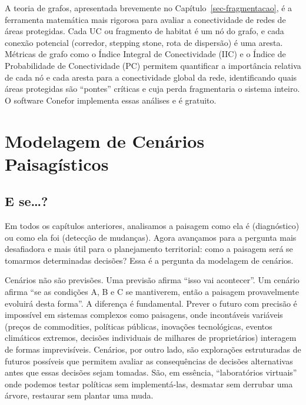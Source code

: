 \documentclass[
  portuguese,
  11pt,
  a4paper,
  open=any]{scrbook}
\begin{document}
\begin{tcolorbox}[enhanced jigsaw, colbacktitle=quarto-callout-tip-color!10!white, coltitle=black, opacityback=0, breakable, left=2mm, colback=white, bottomtitle=1mm, toptitle=1mm, titlerule=0mm, arc=.35mm, opacitybacktitle=0.6, leftrule=.75mm, colframe=quarto-callout-tip-color-frame, title=\textcolor{quarto-callout-tip-color}{\faLightbulb}\hspace{0.5em}{Para aprofundar}, rightrule=.15mm, bottomrule=.15mm, toprule=.15mm]

A teoria de grafos, apresentada brevemente no
Capítulo~\ref{sec-fragmentacao}, é a ferramenta matemática mais rigorosa
para avaliar a conectividade de redes de áreas protegidas. Cada UC ou
fragmento de habitat é um nó do grafo, e cada conexão potencial
(corredor, stepping stone, rota de dispersão) é uma aresta. Métricas de
grafo como o Índice Integral de Conectividade (IIC) e o Índice de
Probabilidade de Conectividade (PC) permitem quantificar a importância
relativa de cada nó e cada aresta para a conectividade global da rede,
identificando quais áreas protegidas são ``pontes'' críticas e cuja
perda fragmentaria o sistema inteiro. O software Conefor implementa
essas análises e é gratuito.

\end{tcolorbox}

\chapter{Modelagem de Cenários
Paisagísticos}\label{sec-modelagem-cenarios}

\section{E se\ldots?}\label{e-se}

Em todos os capítulos anteriores, analisamos a paisagem como ela é
(diagnóstico) ou como ela foi (detecção de mudanças). Agora avançamos
para a pergunta mais desafiadora e mais útil para o planejamento
territorial: como a paisagem será se tomarmos determinadas decisões?
Essa é a pergunta da modelagem de cenários.

Cenários não são previsões. Uma previsão afirma ``isso vai acontecer''.
Um cenário afirma ``se as condições A, B e C se mantiverem, então a
paisagem provavelmente evoluirá desta forma''. A diferença é
fundamental. Prever o futuro com precisão é impossível em sistemas
complexos como paisagens, onde incontáveis variáveis (preços de
commodities, políticas públicas, inovações tecnológicas, eventos
climáticos extremos, decisões individuais de milhares de proprietários)
interagem de formas imprevisíveis. Cenários, por outro lado, são
explorações estruturadas de futuros possíveis que permitem avaliar as
consequências de decisões alternativas antes que essas decisões sejam
tomadas. São, em essência, ``laboratórios virtuais'' onde podemos testar
políticas sem implementá-las, desmatar sem derrubar uma árvore,
restaurar sem plantar uma muda.
\end{document}
